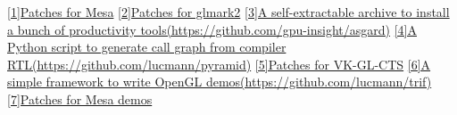 
\begin{cventries}
    \cventry
    {}
    {\hypertarget{mesa-mr}{\href{https://gitlab.freedesktop.org/mesa/mesa/-/merge\_requests?scope=all&state=all&author\_username=lucmann}{[1]Patches for Mesa}}}
    {}
    {}
    {}
    \cventry
    {}
    {\hypertarget{cpp-proj}{\href{https://github.com/glmark2/glmark2/commits/master/?author=lucmann}{[2]Patches for glmark2}}}
    {}
    {}
    {}
    \cventry
    {}
    {\hypertarget{shell-proj}{\href{https://github.com/gpu-insight/asgard}{[3]A self-extractable archive to install a bunch of productivity tools\newline(https://github.com/gpu-insight/asgard)}}}
    {}
    {}
    {}
    \cventry
    {}
    {\hypertarget{python-proj}{\href{https://github.com/lucmann/pyramid}{[4]A Python script to generate call graph from compiler RTL\newline(https://github.com/lucmann/pyramid)}}}
    {}
    {}
    {}
    \cventry
    {}
    {\href{https://github.com/KhronosGroup/VK-GL-CTS/commits/main/?author=lucmann}{[5]Patches for VK-GL-CTS}}
    {}
    {}
    {}
    \cventry
    {}
    {\href{https://github.com/lucmann/trif}{[6]A simple framework to write OpenGL demos\newline(https://github.com/lucmann/trif)}}
    {}
    {}
    {}
    \cventry
    {}
    {\href{https://gitlab.freedesktop.org/lucmann/demos/-/commits/main?author=Luc%20Ma}{[7]Patches for Mesa demos}}
    {}
    {}
    {}
\end{cventries}
